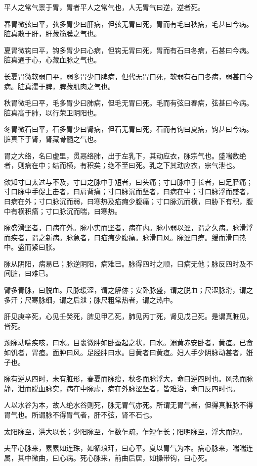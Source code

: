 \documentclass{article}%
\begin{document}
平人之常气禀于胃，胃者平人之常气也，人无胃气曰逆，逆者死。

春胃微弦曰平，弦多胃少曰肝病，但弦无胃曰死，胃而有毛曰秋病，毛甚曰今病。脏真散于肝，肝藏筋膜之气也。

夏胃微钩曰平，钩多胃少曰心病，但钩无胃曰死，胃而有石曰冬病，石甚曰今病。脏真通于心，心藏血脉之气也。

长夏胃微软弱曰平，弱多胃少曰脾病，但代无胃曰死，软弱有石曰冬病，弱甚曰今病。脏真濡于脾，脾藏肌肉之气也。

秋胃微毛曰平，毛多胃少曰肺病，但毛无胃曰死。毛而有弦曰春病，弦甚曰今病。脏真高于肺，以行荣卫阴阳也。

冬胃微石曰平，石多胃少曰肾病，但石无胃曰死，石而有钩曰夏病，钩甚曰今病。脏真下于肾，肾藏骨髓之气也。

胃之大络，名曰虚里，贯鬲络肺，出于左乳下，其动应衣，脉宗气也。盛喘数绝者，则病在中；结而横，有积矣；绝不至曰死。乳之下其动应衣，宗气泄也。

欲知寸口太过与不及，寸口之脉中手短者，曰头痛；寸口脉中手长者，曰足胫痛；寸口脉中手促上击者，曰肩背痛；寸口脉沉而坚者，曰病在中；寸口脉浮而盛者，曰病在外；寸口脉沉而弱，曰寒热及疝瘕少腹痛；寸口脉沉而横，曰胁下有积，腹中有横积痛；寸口脉沉而喘，曰寒热。

脉盛滑坚者，曰病在外。脉小实而坚者，病在内。脉小弱以涩，谓之久病。脉滑浮而疾者，谓之新病。脉急者，曰疝瘕少腹痛。脉滑曰风。脉涩曰痹。缓而滑曰热中。盛而紧曰胀。

脉从阴阳，病易已；脉逆阴阳，病难已。脉得四时之顺，曰病无他；脉反四时及不间脏，曰难已。

臂多青脉，曰脱血。尺脉缓涩，谓之解㑊；安卧脉盛，谓之脱血；尺涩脉滑，谓之多汗；尺寒脉细，谓之后泄；脉尺粗常热者，谓之热中。

肝见庚辛死，心见壬癸死，脾见甲乙死，肺见丙丁死，肾见戊己死。是谓真脏见，皆死。

颈脉动喘疾咳，曰水。目裹微肿如卧蚕起之状，曰水。溺黄赤安卧者，黄疸。已食如饥者，胃疸。面肿曰风。足胫肿曰水。目黄者曰黄疸。妇人手少阴脉动甚者，姙子也。

脉有逆从四时，未有脏形，春夏而脉瘦，秋冬而脉浮大，命曰逆四时也。风热而脉静，泄而脱血脉实，病在中脉虚，病在外脉涩坚者，皆难治，命曰反四时也。

人以水谷为本，故人绝水谷则死，脉无胃气亦死。所谓无胃气者，但得真脏脉不得胃气也。所谓脉不得胃气者，肝不弦，肾不石也。

太阳脉至，洪大以长；少阳脉至，乍数乍疏，乍短乍长；阳明脉至，浮大而短。

夫平心脉来，累累如连珠，如循琅玕，曰心平。夏以胃气为本。病心脉来，喘喘连属，其中微曲，曰心病。死心脉来，前曲后居，如操带钩，曰心死。
\end{document}
